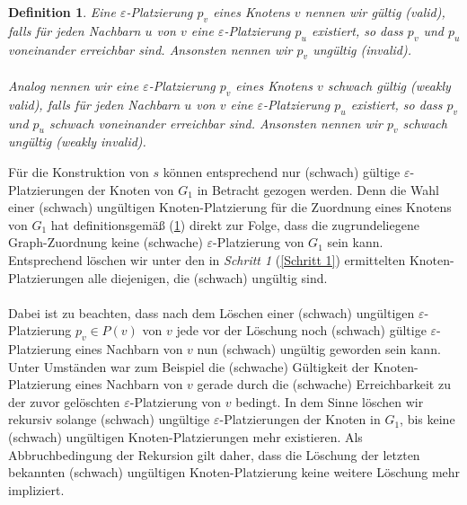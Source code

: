 \documentclass[a4paper, 12pt, twoside]{article}
\theoremstyle{Format1} %
\newtheorem{Def}{Definition}[section]       %
\begin{document}
\begin{Def} \label{Def Platzierung}
	Eine $\varepsilon$-Platzierung $p_v$ eines Knotens $v$ nennen wir \textit{gültig (valid)}, falls für jeden Nachbarn $u$ von $v$
	eine $\varepsilon$-Platzierung $p_u$ existiert, so dass $p_v$ und $p_u$ voneinander erreichbar sind.
	Ansonsten nennen wir $p_v$ \textit{ungültig (invalid)}.
	\\
	\\
	Analog nennen wir eine $\varepsilon$-Platzierung $p_v$ eines Knotens $v$ \textit{schwach gültig (weakly valid)}, falls für jeden Nachbarn $u$ von $v$
	eine $\varepsilon$-Platzierung $p_u$ existiert, so dass $p_v$ und $p_u$ schwach voneinander erreichbar sind.
	Ansonsten nennen wir $p_v$ \textit{schwach ungültig (weakly invalid)}.
\end{Def}

Für die Konstruktion von $s$ können entsprechend nur (schwach) gültige $\varepsilon$-Platzierungen der Knoten von $G_1$ in Betracht gezogen werden. Denn die
Wahl einer (schwach) ungültigen Knoten-Platzierung für die Zuordnung eines Knotens von $G_1$ hat definitionsgemäß (\ref{Def Platzierung}) direkt zur Folge, dass die zugrundeliegene Graph-Zuordnung
keine (schwache) $\varepsilon$-Platzierung von $G_1$ sein kann. Entsprechend löschen wir unter den in \textit{Schritt 1} (\ref{Schritt 1}) ermittelten Knoten-Platzierungen alle diejenigen, die (schwach) ungültig sind.
\\
\\
Dabei ist zu beachten, dass nach dem Löschen einer (schwach) ungültigen $\varepsilon$-Platzierung $p_v \in P(v)$ von $v$
jede vor der Löschung noch (schwach) gültige $\varepsilon$-Platzierung eines Nachbarn von $v$ nun (schwach) ungültig geworden sein kann.
Unter Umständen war zum Beispiel die (schwache) Gültigkeit der Knoten-Platzierung eines Nachbarn von $v$ gerade durch die (schwache) Erreichbarkeit zu der zuvor gelöschten
$\varepsilon$-Platzierung von $v$ bedingt.
In dem Sinne löschen wir rekursiv solange (schwach) ungültige $\varepsilon$-Platzierungen der Knoten in $G_1$, bis
keine (schwach) ungültigen Knoten-Platzierungen mehr existieren. Als Abbruchbedingung der Rekursion gilt daher, dass die Löschung der letzten bekannten (schwach)
ungültigen Knoten-Platzierung keine weitere Löschung mehr impliziert.
\end{document}

